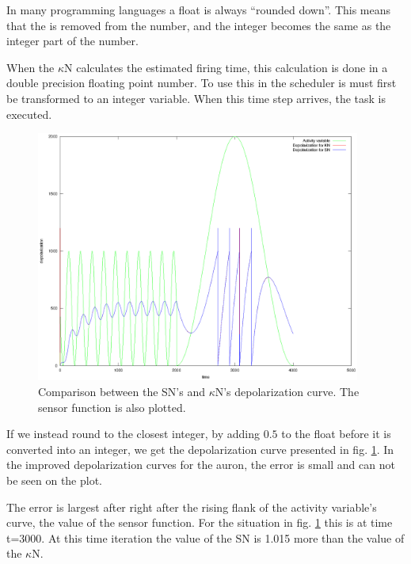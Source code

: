 In many programming languages a float is always ``rounded down''. This means that the %
is removed from the number, and the integer becomes the same as the integer part of the number.

When the $\kappa$N calculates the estimated firing time, this calculation is done in a double precision floating point number. 
To use this in the scheduler is must first be transformed to an integer variable. When this time step arrives, the task is executed.

\begin{figure}[hbtp!]
	\label{figComparisonBetweenSsensorAndKsensorDepolCurveFIXEdError}
	\centering
		\includegraphics[width=0.95\textwidth]{eps_Comparison_between_the_two_sensors__depol_FIKSA.eps}
	\caption{Comparison between the SN's and $\kappa$N's depolarization curve. The sensor function is also plotted.}
\end{figure}

If we instead round to the closest integer, by adding $0.5$ to the float before it is converted into an integer, we get the depolarization curve presented in fig. \ref{figComparisonBetweenSsensorAndKsensorDepolCurveFIXEdError}.
In the improved depolarization curves for the auron, the error is small and can not be seen on the plot.

The error is largest after right after the rising flank of the activity variable's curve, the value of the sensor function.
For the situation in fig. \ref{figComparisonBetweenSsensorAndKsensorDepolCurveFIXEdError} this is at time t=3000.
At this time iteration the value of the SN is 1.015 more than the value of the $\kappa$N. 

